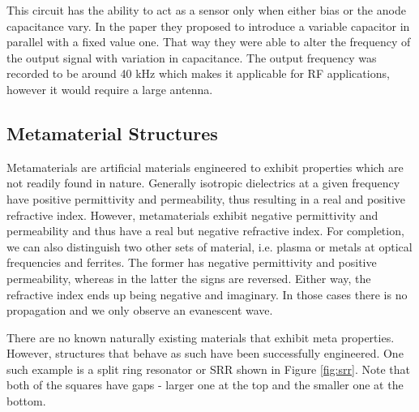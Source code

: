 \documentclass[11pt,a4paper]{article}
\begin{document}
This circuit has the ability to act as a sensor only when either bias or the anode capacitance vary. In the paper they proposed to introduce a variable capacitor in parallel with a fixed value one. That way they were able to alter the frequency of the output signal with variation in capacitance. The output frequency was recorded to be around 40 kHz which makes it applicable for RF applications, however it would require a large antenna.

\subsection{Metamaterial Structures}

Metamaterials are artificial materials engineered to exhibit properties which are not readily found in nature. Generally isotropic dielectrics at a given frequency have positive permittivity and permeability, thus resulting in a real and positive refractive index. However, metamaterials exhibit negative permittivity and permeability and thus have a real but negative refractive index. For completion, we can also distinguish two other sets of material, i.e. plasma or metals at optical frequencies and ferrites. The former has negative permittivity and positive permeability, whereas in the latter the signs are reversed. Either way, the refractive index ends up being negative and imaginary. In those cases there is no propagation and we only observe an evanescent wave.

There are no known naturally existing materials that exhibit meta properties. However, structures that behave as such have been successfully engineered. One such example is a split ring resonator or SRR shown in Figure \ref{fig:srr}. Note that both of the squares have gaps - larger one at the top and the smaller one at the bottom.
\end{document}
